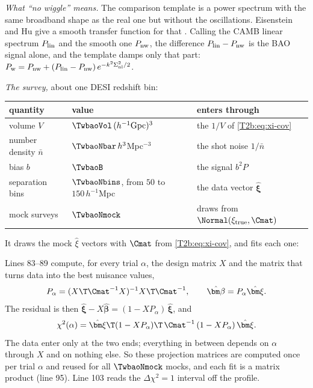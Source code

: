 \emph{What ``no wiggle'' means.} The comparison template is a power spectrum with the same broadband shape as the real one but without the oscillations. Eisenstein and Hu give a smooth transfer function for that \cite[eqs.~(26), (28)--(31)]{EisensteinHu1998}. Calling the CAMB linear spectrum $P_{\rm lin}$ and the smooth one $P_{\rm nw}$, the difference $P_{\rm lin}-P_{\rm nw}$ is the BAO signal alone, and the template damps only that part: $P_{\rm w}=P_{\rm nw}+(P_{\rm lin}-P_{\rm nw})\,e^{-k^2\Sigma_{\rm nl}^2/2}$.

\emph{The survey,} about one DESI redshift bin:
\begin{center}
\small
\begin{tabular}{@{}lll@{}}
\toprule
quantity & value & enters through\\
\midrule
volume $V$ & $\TwbaoVol\,(h^{-1}{\rm Gpc})^3$ & the $1/V$ of \eqref{T2b:eq:xi-cov}\\
number density $\bar n$ & $\TwbaoNbar\,h^3$Mpc$^{-3}$ & the shot noise $1/\bar n$\\
bias $b$ & $\TwbaoB$ & the signal $b^2P$\\
separation bins & $\TwbaoNbins$, from $50$ to $150\,h^{-1}$Mpc & the data vector $\hat{\bm\xi}$\\
mock surveys & $\TwbaoNmock$ & draws from $\Normal(\xi_{\rm true},\Cmat)$\\
\bottomrule
\end{tabular}
\end{center}
It draws the mock $\hat\xi$ vectors with $\Cmat$ from \eqref{T2b:eq:xi-cov}, and fits each one:


\noindent Lines 83--89 compute, for every trial $\alpha$, the design matrix $X$ and the matrix that turns data into the best nuisance values,
\[
  P_\alpha=(X\T\Cmat^{-1}X)^{-1}X\T\Cmat^{-1},\qquad \hat{\bm\beta}=P_\alpha\hat{\bm\xi} .
\]
The residual is then $\hat{\bm\xi}-X\hat{\bm\beta}=(1-XP_\alpha)\,\hat{\bm\xi}$, and
\[
  \chi^2(\alpha)=\hat{\bm\xi}\T(1-XP_\alpha)\T\,\Cmat^{-1}\,(1-XP_\alpha)\,\hat{\bm\xi} .
\]
The data enter only at the two ends; everything in between depends on $\alpha$ through $X$ and on nothing else. So these projection matrices are computed once per trial $\alpha$ and reused for all $\TwbaoNmock$ mocks, and each fit is a matrix product (line 95). Line 103 reads the $\Delta\chi^2=1$ interval off the profile.

